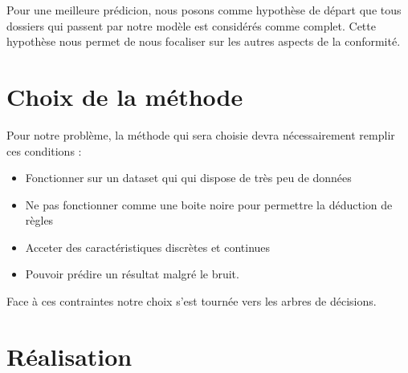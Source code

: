 Pour une meilleure prédicion, nous posons comme hypothèse de départ que tous
dossiers qui passent par notre modèle est considérés comme complet. Cette
hypothèse nous permet de nous focaliser sur les autres aspects de la conformité.

\section{Choix de la méthode}
Pour notre problème, la méthode qui sera choisie devra nécessairement remplir
ces conditions :
\begin{itemize}
  \item Fonctionner sur un dataset qui qui dispose de très peu de données
  \item Ne pas fonctionner comme une boite noire pour permettre la déduction de
    règles
  \item Acceter des caractéristiques discrètes et continues
  \item Pouvoir prédire un résultat malgré le bruit.
\end{itemize}

Face à ces contraintes notre choix s'est tournée vers les arbres de décisions.

\section{Réalisation}

